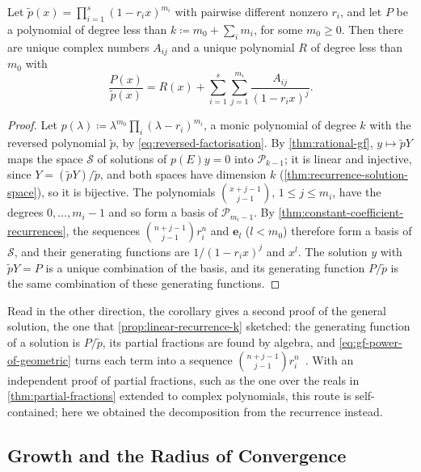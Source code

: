 \begin{corollary}
\label{cor:complex-partial-fractions}
Let $\tilde p(x)=\prod_{i=1}^s(1-r_ix)^{m_i}$ with pairwise different nonzero $r_i$, and let $P$ be a polynomial of degree less than $k\coloneqq m_0+\sum_im_i$, for some $m_0\ge0$. Then there are unique complex numbers $A_{ij}$ and a unique polynomial $R$ of degree less than $m_0$ with
\[
\frac{P(x)}{\tilde p(x)}=R(x)+\sum_{i=1}^s\sum_{j=1}^{m_i}\frac{A_{ij}}{(1-r_ix)^j} .
\]
\end{corollary}

\begin{proof}
Let $p(\lambda)\coloneqq\lambda^{m_0}\prod_i(\lambda-r_i)^{m_i}$, a monic polynomial of degree $k$ with the reversed polynomial $\tilde p$, by \eqref{eq:reversed-factorisation}. By \cref{thm:rational-gf}, $y\mapsto\tilde pY$ maps the space $\mathcal S$ of solutions of $p(E)y=0$ into $\mathcal P_{k-1}$; it is linear and injective, since $Y=(\tilde pY)/\tilde p$, and both spaces have dimension $k$ (\cref{thm:recurrence-solution-space}), so it is bijective. The polynomials $\binom{x+j-1}{j-1}$, $1\le j\le m_i$, have the degrees $0,\ldots,m_i-1$ and so form a basis of $\mathcal P_{m_i-1}$. By \cref{thm:constant-coefficient-recurrences}, the sequences $\binom{n+j-1}{j-1}r_i^n$ and $\mathbf e_l$ ($l<m_0$) therefore form a basis of $\mathcal S$, and their generating functions are $1/(1-r_ix)^j$ and $x^l$. The solution $y$ with $\tilde pY=P$ is a unique combination of the basis, and its generating function $P/\tilde p$ is the same combination of these generating functions.
\end{proof}

Read in the other direction, the corollary gives a second proof of the general solution, the one that \cref{prop:linear-recurrence-k} sketched: the generating function of a solution is $P/\tilde p$, its partial fractions are found by algebra, and \eqref{eq:gf-power-of-geometric} turns each term into a sequence $\binom{n+j-1}{j-1}r_i^n$~\cite[Sect.~7.3]{graham1994concrete}. With an independent proof of partial fractions, such as the one over the reals in \cref{thm:partial-fractions} extended to complex polynomials, this route is self-contained; here we obtained the decomposition from the recurrence instead.

\subsection{Growth and the Radius of Convergence}

